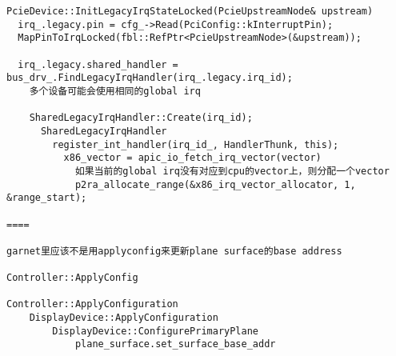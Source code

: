 \begin{verbatim}
PcieDevice::InitLegacyIrqStateLocked(PcieUpstreamNode& upstream)
  irq_.legacy.pin = cfg_->Read(PciConfig::kInterruptPin);
  MapPinToIrqLocked(fbl::RefPtr<PcieUpstreamNode>(&upstream));

  irq_.legacy.shared_handler = bus_drv_.FindLegacyIrqHandler(irq_.legacy.irq_id);
    多个设备可能会使用相同的global irq

    SharedLegacyIrqHandler::Create(irq_id);
      SharedLegacyIrqHandler
        register_int_handler(irq_id_, HandlerThunk, this);
          x86_vector = apic_io_fetch_irq_vector(vector)
            如果当前的global irq没有对应到cpu的vector上，则分配一个vector
            p2ra_allocate_range(&x86_irq_vector_allocator, 1, &range_start);

====

garnet里应该不是用applyconfig来更新plane surface的base address

Controller::ApplyConfig

Controller::ApplyConfiguration
    DisplayDevice::ApplyConfiguration
        DisplayDevice::ConfigurePrimaryPlane
            plane_surface.set_surface_base_addr

\end{verbatim}